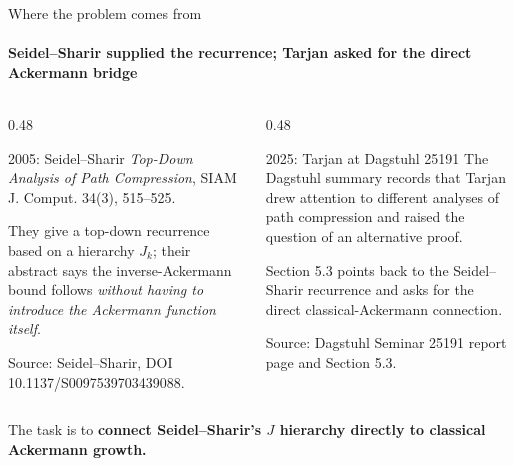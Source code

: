 \documentclass[aspectratio=169,11pt]{beamer}
\newcommand{\source}[1]{{\scriptsize\color{darkgray}#1}}
\begin{document}
\begin{frame}{Where the problem comes from}
\framesubtitle{Seidel--Sharir supplied the recurrence; Tarjan asked for the direct Ackermann bridge}
\begin{columns}[T,totalwidth=\textwidth]
\begin{column}{0.48\textwidth}
\begin{block}{2005: Seidel--Sharir}
\textit{Top-Down Analysis of Path Compression}, SIAM J. Comput. 34(3), 515--525.
\medskip

They give a top-down recurrence based on a hierarchy $J_k$; their abstract says the inverse-Ackermann bound follows \emph{without having to introduce the Ackermann function itself}.
\end{block}
\source{Source: Seidel--Sharir, DOI 10.1137/S0097539703439088.}
\end{column}
\begin{column}{0.48\textwidth}
\begin{block}{2025: Tarjan at Dagstuhl 25191}
The Dagstuhl summary records that Tarjan drew attention to different analyses of path compression and raised the question of an alternative proof.
\medskip

Section 5.3 points back to the Seidel--Sharir recurrence and asks for the direct classical-Ackermann connection.
\end{block}
\source{Source: Dagstuhl Seminar 25191 report page and Section 5.3.}
\end{column}
\end{columns}
\vspace{0.35cm}
\begin{center}
\Large The task is to \textbf{connect Seidel--Sharir's $J$ hierarchy directly to classical Ackermann growth.}
\end{center}
\end{frame}
\end{document}
